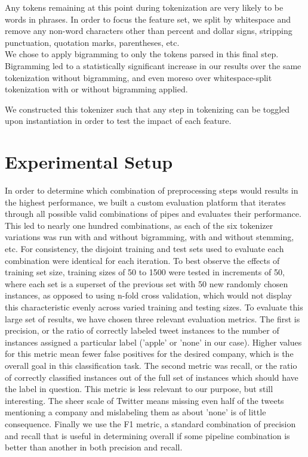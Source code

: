 \documentclass[letterpaper]{article}
\begin{document}
Any tokens remaining at this point during tokenization are very likely to be words in phrases. In order to focus the feature set, we split by whitespace and remove any non-word characters other than percent and dollar signs, stripping punctuation, quotation marks, parentheses, etc. \\

We chose to apply bigramming to only the tokens parsed in this final step. Bigramming led to a statistically significant increase in our results over the same tokenization without bigramming, and even moreso over whitespace-split tokenization with or without bigramming applied.

We constructed this tokenizer such that any step in tokenizing can be toggled upon instantiation in order to test the impact of each feature.\\

\section{Experimental Setup}
In order to determine which combination of preprocessing steps would results in the highest performance, we built a custom evaluation platform that iterates through all possible valid combinations of pipes and evaluates their performance. This led to nearly one hundred combinations, as each of the six tokenizer variations was run with and without bigramming, with and without stemming, etc. For consistency, the disjoint training and test sets used to evaluate each combination were identical for each iteration. To best observe the effects of training set size, training sizes of 50 to 1500 were tested in increments of 50, where each set is a superset of the previous set with 50 new randomly chosen instances, as opposed to using n-fold cross validation, which would not display this characteristic evenly across varied training and testing sizes. To evaluate this large set of results, we have chosen three relevant evaluation metrics. The first is precision, or the ratio of correctly labeled tweet instances to the number of instances assigned a particular label ('apple' or 'none' in our case). Higher values for this metric mean fewer false positives for the desired company, which is the overall goal in this classification task. The second metric was recall, or the ratio of correctly classified instances out of the full set of instances which should have the label in question. This metric is less relevant to our purpose, but still interesting. The sheer scale of Twitter means missing even half of the tweets mentioning a company and mislabeling them as about 'none' is of little consequence. Finally we use the F1 metric, a standard combination of precision and recall that is useful in determining overall if some pipeline combination is better than another in both precision and recall.
\end{document}
